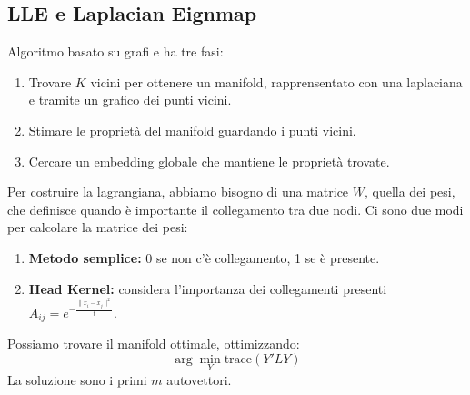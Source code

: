 \subsection{LLE e Laplacian Eignmap}
Algoritmo basato su grafi e ha tre fasi:
\begin{enumerate}
  \item Trovare $K$ vicini per ottenere un manifold, rapprensentato con una laplaciana e tramite un grafico dei punti vicini.
  \item Stimare le proprietà del manifold guardando i punti vicini.
  \item Cercare un embedding globale che mantiene le proprietà trovate.
\end{enumerate}
Per costruire la lagrangiana, abbiamo bisogno di una matrice $W$, quella dei pesi, che definisce quando è importante il collegamento tra due nodi.
Ci sono due modi per calcolare la matrice dei pesi:
\begin{enumerate}
  \item \textbf{Metodo semplice:} 0 se non c'è collegamento, 1 se è presente.
  \item \textbf{Head Kernel:} considera l’importanza dei collegamenti presenti $A_{ij} = e^{-\frac{\|x_i - x_j\|^2}{t}}$.
\end{enumerate}
Possiamo trovare il manifold ottimale, ottimizzando:
\[
  \arg\min_Y \text{trace}(Y'LY)
\]
La soluzione sono i primi $m$ autovettori.
